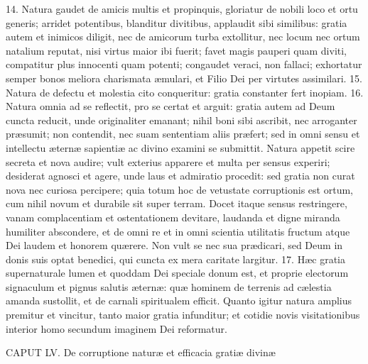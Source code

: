 \documentclass[twoside]{article}
\begin{document}
14. Natura gaudet de amicis multis et propinquis, gloriatur de nobili loco et ortu generis; arridet potentibus, blanditur divitibus, applaudit sibi similibus: gratia autem et inimicos diligit, nec de amicorum turba extollitur, nec locum nec ortum natalium reputat, nisi virtus maior ibi fuerit; favet magis pauperi quam diviti, compatitur plus innocenti quam potenti; congaudet veraci, non fallaci; exhortatur semper bonos meliora charismata æmulari, et Filio Dei per virtutes assimilari.
15. Natura de defectu et molestia cito conqueritur: gratia constanter fert inopiam.
16. Natura omnia ad se reflectit, pro se certat et arguit: gratia autem ad Deum cuncta reducit, unde originaliter emanant; nihil boni sibi ascribit, nec arroganter præsumit; non contendit, nec suam sententiam aliis præfert; sed in omni sensu et intellectu æternæ sapientiæ ac divino examini se submittit. Natura appetit scire secreta et nova audire; vult exterius apparere et multa per sensus experiri; desiderat agnosci et agere, unde laus et admiratio procedit: sed gratia non curat nova nec curiosa percipere; quia totum hoc de vetustate corruptionis est ortum, cum nihil novum et durabile sit super terram. Docet itaque sensus restringere, vanam complacentiam et ostentationem devitare, laudanda et digne miranda humiliter abscondere, et de omni re et in omni scientia utilitatis fructum atque Dei laudem et honorem quærere. Non vult se nec sua prædicari, sed Deum in donis suis optat benedici, qui cuncta ex mera caritate largitur.
17. Hæc gratia supernaturale lumen et quoddam Dei speciale donum est, et proprie electorum signaculum et pignus salutis æternæ: quæ hominem de terrenis ad cælestia amanda sustollit, et de carnali spiritualem efficit. Quanto igitur natura amplius premitur et vincitur, tanto maior gratia infunditur; et cotidie novis visitationibus interior homo secundum imaginem Dei reformatur.


CAPUT LV.
De corruptione naturæ et efficacia gratiæ divinæ
\end{document}
